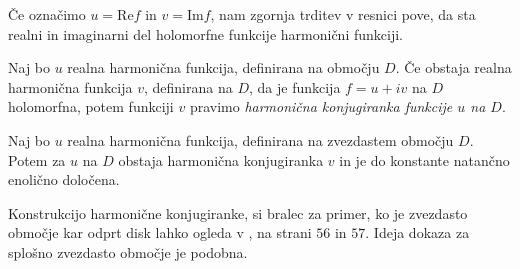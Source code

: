 \documentclass[mat1]{fmfdelo}
\begin{document}
    \begin{opomba}
        Če označimo $u = \text{Re}{f}$ in $v = \text{Im}{f}$, nam zgornja trditev v resnici pove, da sta realni in imaginarni del holomorfne funkcije harmonični funkciji. 
    \end{opomba}

    \begin{definicija}
        Naj bo $u$ realna harmonična funkcija, definirana na območju $D$. Če obstaja realna harmonična funkcija $v$, definirana na $D$, da je funkcija $f = u + iv$ na $D$ holomorfna, potem funkciji $v$ pravimo \emph{harmonična konjugiranka funkcije $u$ na $D$}.    
    \end{definicija}

    \begin{trditev}
        \label{konj}
        Naj bo $u$ realna harmonična funkcija, definirana na zvezdastem območju $D$. Potem za $u$ na $D$ obstaja harmonična konjugiranka $v$ in je do konstante natančno enolično določena. 
    \end{trditev}
    \begin{dokaz}
        Konstrukcijo harmonične konjugiranke, si bralec za primer, ko je zvezdasto območje kar odprt disk lahko ogleda v \cite{osnova}, na strani $56$ in $57$. 
        Ideja dokaza za splošno zvezdasto območje je podobna. 
    \end{dokaz}
\end{document}
